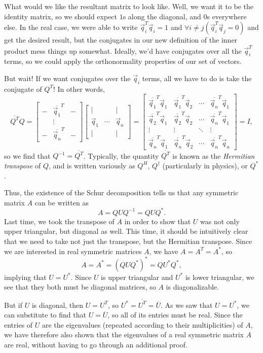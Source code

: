 \documentclass[letterpaper]{article}
\theoremstyle{remark}
\newcommand{\mat}[1]{\ensuremath{\begin{bmatrix}#1\end{bmatrix}}}
\begin{document}
What would we like the resultant matrix to look like. Well, we want it to be the identity matrix, so we should expect $1$s along the diagonal, and $0$s everywhere else. In the real case, we were able to write $\vec{q}_i^T\vec{q}_i = 1$ and $\forall i \ne j(\vec{q}_i^T\vec{q}_j = 0)$ and get the desired result, but the conjugates in our new definition of the inner product mess things up somewhat. Ideally, we'd have conjugates over all the $\vec{q}_i^T$ terms, so we could apply the orthonormality properties of our set of vectors.

But wait! If we want conjugates over the $\vec{q}_i$ terms, all we have to do is take the conjugate of $Q^T$! In other words,
\[
    \overline{Q^T}Q = \mat{ - & \overline{\vec{q}_1}^T & - \\ & \vdots & \\ - & \overline{\vec{q}_n}^T & -}\mat{| & & | \\ \vec{q}_1 & \cdots & \vec{q}_n \\ | & & |} = \mat{
    \overline{\vec{q}_1}^T\vec{q}_1 & \overline{\vec{q}_1}^T\vec{q}_2 & \cdots & \overline{\vec{q}_n}^T\vec{q}_1 \\ 
    \overline{\vec{q}_2}^T\vec{q}_1 & \overline{\vec{q}_2}^T\vec{q}_2 & \cdots & \overline{\vec{q}_n}^T\vec{q}_1 \\
    \vdots & \vdots & \ddots & \vdots \\
    \overline{\vec{q}_n}^T\vec{q}_1 & \overline{\vec{q}_n}^T\vec{q}_2 & \cdots & \overline{\vec{q}_n}^T\vec{q}_n
    } = I,
\]
so we find that $Q^{-1} = \overline{Q^T}$. Typically, the quantity $\overline{Q^T}$ is known as the \emph{Hermitian transpose} of $Q$, and is written variously as $Q^H$, $Q^\dagger$ (particularly in physics), or $Q^*$.

Thus, the existence of the Schur decomposition tells us that any symmetric matrix $A$ can be written as
\[
    A = QUQ^{-1} = QUQ^*.
\]
Last time, we took the transpose of $A$ in order to show that $U$ was not only upper triangular, but diagonal as well. This time, it should be intuitively clear that we need to take not just the transpose, but the Hermitian transpose. Since we are interested in real symmetric matrices $A$, we have $A = A^T = A^*$, so
\[
    A = A^* = (QUQ^*)^* = QU^*Q^*,
\]
implying that $U = U^*$. Since $U$ is upper triangular and $U^*$ is lower triangular, we see that they both must be diagonal matrices, so $A$ is diagonalizable.

But if $U$ is diagonal, then $U = U^T$, so $U^* = \overline{U^T} = \overline{U}$. As we saw that $U = U^*$, we can substitute to find that $U = \overline{U}$, so all of its entries must be real. Since the entries of $U$ are the eigenvalues (repeated according to their multiplicities) of $A$, we have therefore also shown that the eigenvalues of a real symmetric matrix $A$ are real, without having to go through an additional proof.
\end{document}
